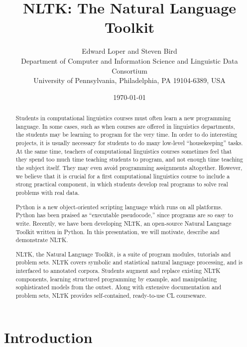 \documentclass[11pt]{article}
\title{NLTK: The Natural Language Toolkit}
\author{
Edward Loper and Steven Bird\\
Department of Computer and Information Science and Linguistic Data Consortium\\
University of Pennsylvania, Philadelphia, PA 19104-6389, USA
}
\date{\today}
\begin{document}
\makeidpage
\maketitle

\begin{abstract}
Students in computational linguistics courses must often learn
a new programming language.  In some cases, such as when courses
are offered in linguistics departments,
the students may be learning to program for the very time.
In order to do interesting projects, it is usually necessary for
students to do many low-level ``housekeeping'' tasks.  At the same
time, teachers of computational linguistics courses sometimes feel
that they spend too much time teaching students to program, and not
enough time teaching the subject itself.  They may even avoid
programming assignments altogether.  However, we believe that it is
crucial for a first computational linguistics course to include a
strong practical component, in which students develop real programs to
solve real problems with real data.

Python is a new object-oriented scripting language which runs on all
platforms.  Python has been praised as ``executable pseudocode,'' since
programs are so easy to write.  Recently, we have been developing
NLTK, an open-source Natural Language Toolkit written in Python.
In this presentation, we will motivate, describe and demonstrate NLTK.

NLTK, the Natural Language Toolkit, is a suite of program modules,
tutorials and problem sets.  NLTK covers symbolic and statistical
natural language processing, and is interfaced to annotated corpora.
Students augment and replace existing NLTK components, learning
structured programming by example, and manipulating sophisticated
models from the outset.  Along with extensive documentation and
problem sets, NLTK provides self-contained, ready-to-use CL
courseware.
\end{abstract}

\section{Introduction}
\end{document}
